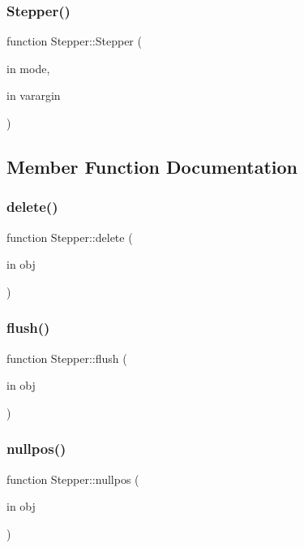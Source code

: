 \subsubsection{\texorpdfstring{Stepper()}{Stepper()}}
{\footnotesize\ttfamily function Stepper\+::\+Stepper (\begin{DoxyParamCaption}\item[{in}]{mode,  }\item[{in}]{varargin }\end{DoxyParamCaption})}



\subsection{Member Function Documentation}
\mbox{\label{class_stepper_a9a5b14b0e09de7315a3695b0c38c00d8}} 
\subsubsection{\texorpdfstring{delete()}{delete()}}
{\footnotesize\ttfamily function Stepper\+::delete (\begin{DoxyParamCaption}\item[{in}]{obj }\end{DoxyParamCaption})}

\mbox{\label{class_stepper_a09e1d2bca7c3ec73d92659cc4a57a3c7}} 
\subsubsection{\texorpdfstring{flush()}{flush()}}
{\footnotesize\ttfamily function Stepper\+::flush (\begin{DoxyParamCaption}\item[{in}]{obj }\end{DoxyParamCaption})}

\mbox{\label{class_stepper_ab5a1152af6d956e4e05baa0d35efcca7}} 
\subsubsection{\texorpdfstring{nullpos()}{nullpos()}}
{\footnotesize\ttfamily function Stepper\+::nullpos (\begin{DoxyParamCaption}\item[{in}]{obj }\end{DoxyParamCaption})}

